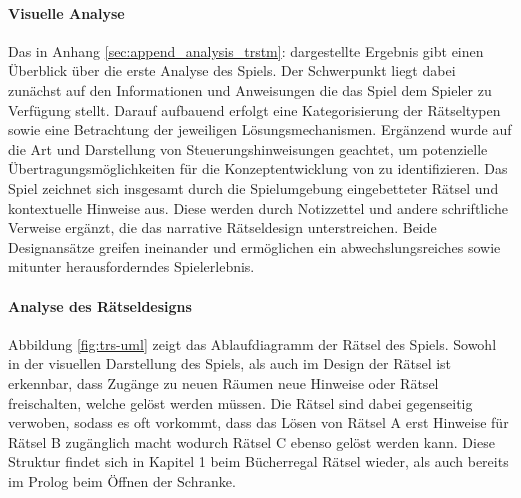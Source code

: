 \paragraph{Visuelle Analyse}
Das in Anhang \ref{sec:append_analysis_trstm}:  dargestellte Ergebnis gibt einen Überblick über die erste Analyse des Spiels. Der Schwerpunkt liegt dabei zunächst auf den Informationen und Anweisungen die das Spiel dem Spieler zu Verfügung stellt. Darauf aufbauend erfolgt eine Kategorisierung der Rätseltypen sowie eine Betrachtung der jeweiligen Lösungsmechanismen. Ergänzend wurde auf die Art und Darstellung von Steuerungshinweisungen geachtet, um potenzielle Übertragungsmöglichkeiten für die Konzeptentwicklung von  zu identifizieren. Das Spiel zeichnet sich insgesamt durch die Spielumgebung eingebetteter Rätsel und kontextuelle Hinweise aus. Diese werden durch Notizzettel und andere schriftliche Verweise ergänzt, die das narrative Rätseldesign unterstreichen. Beide Designansätze greifen ineinander und ermöglichen ein abwechslungsreiches sowie mitunter herausforderndes Spielerlebnis.

\paragraph{Analyse des Rätseldesigns}
Abbildung \ref{fig:trs-uml} zeigt das Ablaufdiagramm der Rätsel des Spiels. Sowohl in der visuellen Darstellung des Spiels, als auch im Design der Rätsel ist erkennbar, dass Zugänge zu neuen Räumen neue Hinweise oder Rätsel freischalten, welche gelöst werden müssen. Die Rätsel sind dabei gegenseitig verwoben, sodass es oft vorkommt, dass das Lösen von Rätsel A erst Hinweise für Rätsel B zugänglich macht wodurch Rätsel C ebenso gelöst werden kann. Diese Struktur findet sich in Kapitel 1 beim Bücherregal Rätsel wieder, als auch bereits im Prolog beim Öffnen der Schranke.

